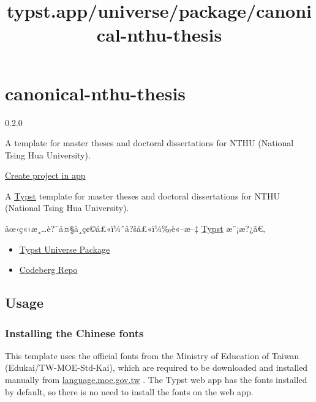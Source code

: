 \title{typst.app/universe/package/canonical-nthu-thesis}

\label{banner}
\label{template-thumbnail}

\section{canonical-nthu-thesis}\label{canonical-nthu-thesis}

{ 0.2.0 }

A template for master theses and doctoral dissertations for NTHU
(National Tsing Hua University).

\href{/app?template=canonical-nthu-thesis&version=0.2.0}{Create project
in app}

\label{readme}
A \href{https://typst.app/docs/}{Typst} template for master theses and
doctoral dissertations for NTHU (National Tsing Hua University).

åœ‹ç«‹æ¸\ldots è?¯å¤§å­¸ç¢©å£«ï¼ˆå?šå£«ï¼‰è«--æ--‡
\href{https://typst.app/docs/}{Typst} æ¨¡æ?¿ã€‚

\begin{itemize}
\tightlist
\item
  \href{https://typst.app/universe/package/canonical-nthu-thesis}{Typst
  Universe Package}
\item
  \href{https://codeberg.org/kotatsuyaki/canonical-nthu-thesis}{Codeberg
  Repo}
\end{itemize}


\subsection{Usage}\label{usage}

\subsubsection{Installing the Chinese
fonts}\label{installing-the-chinese-fonts}

This template uses the official fonts from the Ministry of Education of
Taiwan (Edukai/TW-MOE-Std-Kai), which are required to be downloaded and
installed manually from
\href{https://language.moe.gov.tw/001/Upload/Files/site_content/M0001/edukai-5.0.zip}{language.moe.gov.tw}
. The Typst web app has the fonts installed by default, so there is no
need to install the fonts on the web app.

